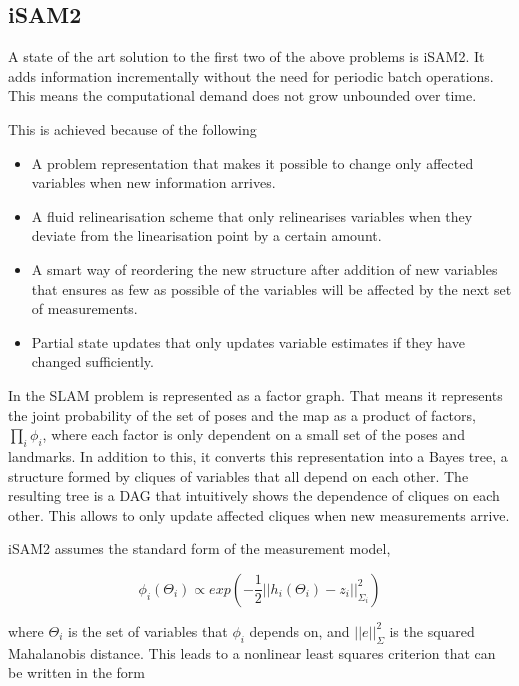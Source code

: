 \subsection{iSAM2}

A state of the art solution to the first two of the above problems is \gls{iSAM2}\cite{iSAM2}. It adds information incrementally without the need for periodic batch operations. This means the computational demand does not grow unbounded over time. 

This is achieved because of the following

\begin{itemize}
    \item A problem representation that makes it possible to change only affected variables when new information arrives.
    \item A fluid relinearisation scheme that only relinearises variables when they deviate from the linearisation point by a certain amount.
    \item A smart way of reordering the new structure after addition of new variables that ensures as few as possible of the variables will be affected by the next set of measurements.
    \item Partial state updates that only updates variable estimates if they have changed sufficiently. 
\end{itemize}

In  the SLAM problem is represented as a factor graph. That means it represents the joint probability of the set of poses and the map as a product of factors, $\prod_i \phi_i$, where each factor is only dependent on a small set of the poses and landmarks. In addition to this, it converts this representation into a Bayes tree, a structure formed by cliques of variables that all depend on each other. The resulting tree is a \gls{DAG} that intuitively shows the dependence of cliques on each other. This allows to only update affected cliques when new measurements arrive.

\gls{iSAM2} assumes the standard form of the measurement model,

\begin{equation}
    \phi_i(\Theta_i) \propto exp(-\frac{1}{2}||h_i(\Theta_i) - z_i||_{\Sigma_i}^2)
\end{equation}

where $\Theta_i$ is the set of variables that $\phi_i$ depends on, and $||e||_{\Sigma}^2$ is the squared Mahalanobis distance\cite{Mahalanobis}. This leads to a nonlinear least squares criterion that can be written in the form 

